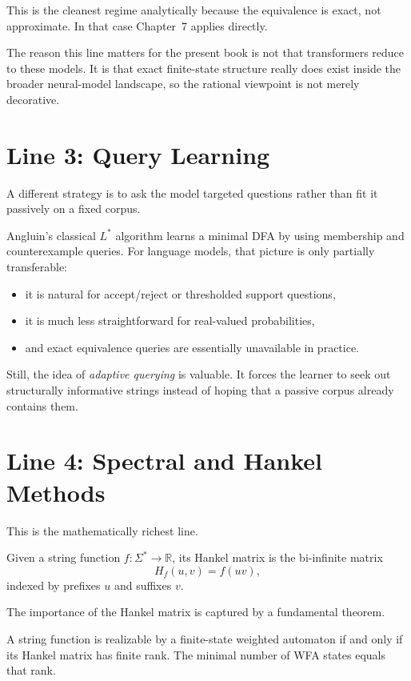 This is the cleanest regime analytically because the equivalence is exact, not approximate. In that case Chapter~7 applies directly.

The reason this line matters for the present book is not that transformers reduce to these models. It is that exact finite-state structure really does exist inside the broader neural-model landscape, so the rational viewpoint is not merely decorative.

\section{Line 3: Query Learning}

A different strategy is to ask the model targeted questions rather than fit it passively on a fixed corpus.

Angluin's classical $L^*$ algorithm learns a minimal DFA by using membership and counterexample queries. For language models, that picture is only partially transferable:
\begin{itemize}
  \item it is natural for accept/reject or thresholded support questions,
  \item it is much less straightforward for real-valued probabilities,
  \item and exact equivalence queries are essentially unavailable in practice.
\end{itemize}

Still, the idea of \emph{adaptive querying} is valuable. It forces the learner to seek out structurally informative strings instead of hoping that a passive corpus already contains them.

\section{Line 4: Spectral and Hankel Methods}

This is the mathematically richest line.

\begin{definition}
Given a string function $f : \Sigma^* \to \mathbb{R}$, its Hankel matrix is the bi-infinite matrix
\[
  H_f(u,v) = f(uv),
\]
indexed by prefixes $u$ and suffixes $v$.
\end{definition}

The importance of the Hankel matrix is captured by a fundamental theorem.

\begin{theorem}
A string function is realizable by a finite-state weighted automaton if and only if its Hankel matrix has finite rank. The minimal number of WFA states equals that rank.
\end{theorem}

